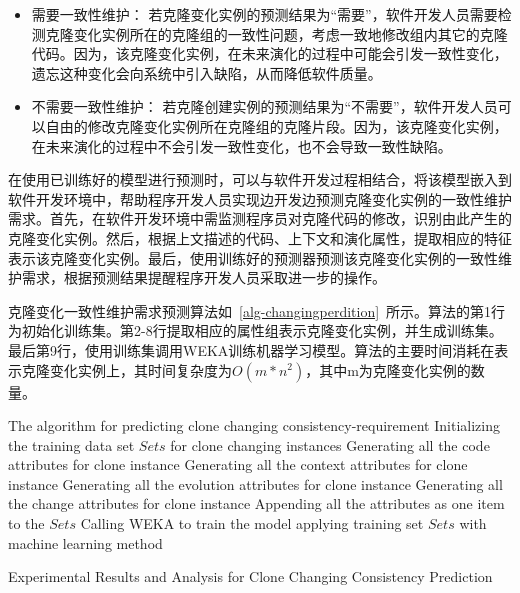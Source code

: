 \begin{itemize}
\item 
需要一致性维护：
若克隆变化实例的预测结果为“需要”，软件开发人员需要检测克隆变化实例所在的克隆组的一致性问题，考虑一致地修改组内其它的克隆代码。因为，该克隆变化实例，在未来演化的过程中可能会引发一致性变化，遗忘这种变化会向系统中引入缺陷，从而降低软件质量。
\item
不需要一致性维护：
若克隆创建实例的预测结果为“不需要”，软件开发人员可以自由的修改克隆变化实例所在克隆组的克隆片段。因为，该克隆变化实例，在未来演化的过程中不会引发一致性变化，也不会导致一致性缺陷。
\end{itemize}

在使用已训练好的模型进行预测时，可以与软件开发过程相结合，将该模型嵌入到软件开发环境中，帮助程序开发人员实现边开发边预测克隆变化实例的一致性维护需求。首先，在软件开发环境中需监测程序员对克隆代码的修改，识别由此产生的克隆变化实例。然后，根据上文描述的代码、上下文和演化属性，提取相应的特征表示该克隆变化实例。最后，使用训练好的预测器预测该克隆变化实例的一致性维护需求，根据预测结果提醒程序开发人员采取进一步的操作。

克隆变化一致性维护需求预测算法如~\ref{alg-changingperdition}~所示。算法的第1行为初始化训练集。第2-8行提取相应的属性组表示克隆变化实例，并生成训练集。最后第9行，使用训练集调用WEKA训练机器学习模型。算法的主要时间消耗在表示克隆变化实例上，其时间复杂度为$O(m*n^2)$，其中m为克隆变化实例的数量。

\begin{minipage}{0.8\textwidth}
\centering
\begin{algorithm}[H]
 {The algorithm for predicting clone changing consistency-requirement}
\label{alg-changingperdition}
Initializing the training data set $Sets$ for clone changing instances\; 
{ 
Generating all the code attributes for clone instance\;
Generating all the context attributes for clone instance\;
Generating all the evolution attributes for clone instance\;
Generating all the change attributes for clone instance\;
Appending all the attributes as one item to the $Sets$\;
}
Calling WEKA to train the model applying training set $Sets$ with machine learning method\;
\end{algorithm}
\end{minipage}

{Experimental Results and Analysis for Clone Changing Consistency Prediction}

